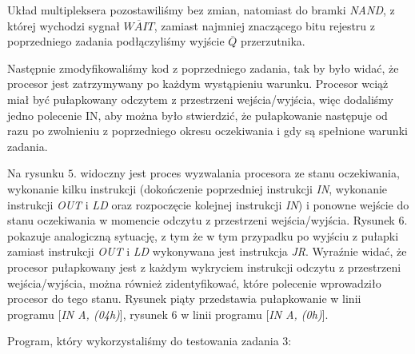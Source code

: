 \documentclass[fleqn]{article}
\begin{document}
Układ multipleksera pozostawiliśmy bez zmian, natomiast do bramki \textit{NAND}, z której wychodzi sygnał $\overline{WAIT}$, zamiast najmniej znaczącego bitu rejestru z poprzedniego zadania podłączyliśmy wyjście $\overline{Q}$ przerzutnika.

Następnie zmodyfikowaliśmy kod z poprzedniego zadania, tak by było widać, że procesor jest zatrzymywany po każdym wystąpieniu warunku. Procesor wciąż miał być pułapkowany odczytem z przestrzeni wejścia/wyjścia, więc dodaliśmy jedno polecenie IN, aby można było stwierdzić, że pułapkowanie następuje od razu po zwolnieniu z poprzedniego okresu oczekiwania i gdy są spełnione warunki zadania.

Na rysunku $5$. widoczny jest proces wyzwalania procesora ze stanu oczekiwania, wykonanie kilku instrukcji (dokończenie poprzedniej instrukcji \textit{IN}, wykonanie instrukcji \textit{OUT} i \textit{LD} oraz rozpoczęcie kolejnej instrukcji \textit{IN}) i ponowne wejście do stanu oczekiwania w momencie odczytu z przestrzeni wejścia/wyjścia. Rysunek $6$. pokazuje analogiczną sytuację, z tym że w tym przypadku po wyjściu z pułapki zamiast instrukcji \textit{OUT} i \textit{LD} wykonywana jest instrukcja \textit{JR}.
Wyraźnie widać, że procesor pułapkowany jest z każdym wykryciem instrukcji odczytu z przestrzeni wejścia/wyjścia, można również zidentyfikować, które polecenie wprowadziło procesor do tego stanu. Rysunek piąty przedstawia pułapkowanie w linii programu [\textit{IN A, (04h)}], rysunek 6 w linii programu [\textit{IN A, (0h)}].

Program, który wykorzystaliśmy do testowania zadania 3:


\end{document}
